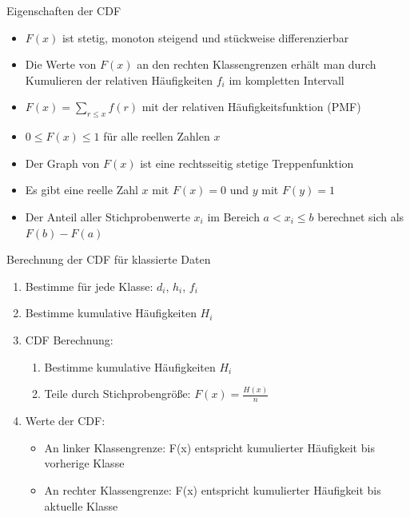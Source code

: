 \begin{concept}{Eigenschaften der CDF}
\begin{itemize}
    \item $F(x)$ ist stetig, monoton steigend und stückweise differenzierbar
    \item Die Werte von $F(x)$ an den rechten Klassengrenzen erhält man durch Kumulieren der relativen Häufigkeiten $f_i$ im kompletten Intervall
    \item $F(x) = \sum_{r\leq x} f(r)$ mit der relativen Häufigkeitsfunktion (PMF)
    \item $0 \leq F(x) \leq 1$ für alle reellen Zahlen $x$
    \item Der Graph von $F(x)$ ist eine rechtsseitig stetige Treppenfunktion
    \item Es gibt eine reelle Zahl $x$ mit $F(x) = 0$ und $y$ mit $F(y) = 1$
    \item Der Anteil aller Stichprobenwerte $x_i$ im Bereich $a < x_i \leq b$ berechnet sich als $F(b) - F(a)$
\end{itemize}
\end{concept}

\begin{KR}{Berechnung der CDF für klassierte Daten}
\begin{enumerate}
    \item Bestimme für jede Klasse: $d_i$, $h_i$, $f_i$
    \item Bestimme kumulative Häufigkeiten $H_i$
    \item CDF Berechnung:
    \begin{enumerate}
        \item Bestimme kumulative Häufigkeiten $H_i$
        \item Teile durch Stichprobengröße: $F(x) = \frac{H(x)}{n}$
    \end{enumerate}
    \item Werte der CDF:
    \begin{itemize}
        \item An linker Klassengrenze: F(x) entspricht kumulierter Häufigkeit bis vorherige Klasse
        \item An rechter Klassengrenze: F(x) entspricht kumulierter Häufigkeit bis aktuelle Klasse
    \end{itemize}
\end{enumerate}
\end{KR}


